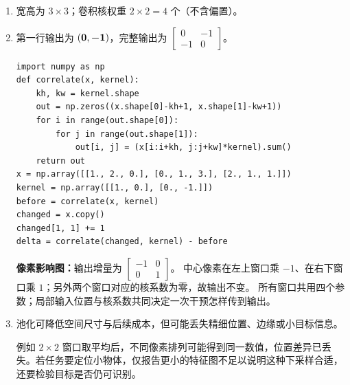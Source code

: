 \begin{enumerate}[label={},leftmargin=4.8em,itemsep=4pt]
\item[\textbf{\hyperref[exercise:convolution-output-shape]{C-125.}}] \leavevmode{}\label{solution:C-125}\label{solution:convolution-output-shape}宽高为 $3\times3$；卷积核权重 $2\times2=4$ 个（不含偏置）。
\item[\textbf{\hyperref[exercise:convolution-shared-kernel]{C-126.}}] \leavevmode{}\label{solution:C-126}\label{solution:convolution-shared-kernel}第一行输出为 $(\boldsymbol{0},\boldsymbol{-1})$，完整输出为 $\left[\begin{smallmatrix}0&-1\\-1&0\end{smallmatrix}\right]$。\par\nobreak
\begin{samepage}\begin{verbatim}
import numpy as np
def correlate(x, kernel):
    kh, kw = kernel.shape
    out = np.zeros((x.shape[0]-kh+1, x.shape[1]-kw+1))
    for i in range(out.shape[0]):
        for j in range(out.shape[1]):
            out[i, j] = (x[i:i+kh, j:j+kw]*kernel).sum()
    return out
x = np.array([[1., 2., 0.], [0., 1., 3.], [2., 1., 1.]])
kernel = np.array([[1., 0.], [0., -1.]])
before = correlate(x, kernel)
changed = x.copy()
changed[1, 1] += 1
delta = correlate(changed, kernel) - before
\end{verbatim}\end{samepage}
\textbf{像素影响图：}输出增量为 $\left[\begin{smallmatrix}-1&0\\0&1\end{smallmatrix}\right]$。
中心像素在左上窗口乘 $-1$、在右下窗口乘 $1$；另外两个窗口对应的核系数为零，故输出不变。
所有窗口共用四个参数；局部输入位置与核系数共同决定一次干预怎样传到输出。
\item[\textbf{\hyperref[exercise:pooling-detail-loss]{C-127.}}] \leavevmode{}\label{solution:C-127}\label{solution:pooling-detail-loss}池化可降低空间尺寸与后续成本，但可能丢失精细位置、边缘或小目标信息。\par 例如 $2\times2$ 窗口取平均后，不同像素排列可能得到同一数值，位置差异已丢失。若任务要定位小物体，仅报告更小的特征图不足以说明这种下采样合适，还要检验目标是否仍可识别。
\end{enumerate}
